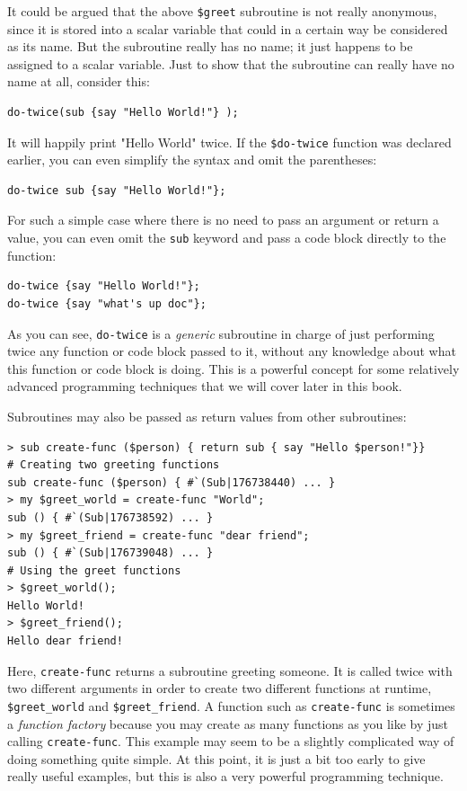 It could be argued that the above \verb"$greet" subroutine  
is not really anonymous, since it is stored into a scalar 
variable that could in a certain way be considered as its name. 
But the subroutine really has no name; it just happens to be 
assigned to a scalar variable. Just to show that the subroutine 
can really have no name at all, consider this:

\begin{verbatim}
do-twice(sub {say "Hello World!"} );
\end{verbatim}

It will happily print "Hello World" twice. If the \verb"$do-twice"
function was declared earlier, you can even simplify the syntax 
and omit the parentheses:

\begin{verbatim}
do-twice sub {say "Hello World!"};
\end{verbatim}

For such a simple case where there is no need to pass an 
argument or return a value, you can even omit the 
\verb"sub" keyword and pass a code block directly to the function:

\begin{verbatim}
do-twice {say "Hello World!"};
do-twice {say "what's up doc"};
\end{verbatim}

As you can see, \verb"do-twice" is a \emph{generic} subroutine in 
charge of just performing twice any function or code 
block passed to it, without any knowledge about what 
this function or code block is doing. This is a powerful 
concept for some relatively advanced programming techniques 
that we will cover later in this book.

Subroutines may also be passed as return values from other 
subroutines:

\begin{verbatim}
> sub create-func ($person) { return sub { say "Hello $person!"}}
# Creating two greeting functions
sub create-func ($person) { #`(Sub|176738440) ... }
> my $greet_world = create-func "World";
sub () { #`(Sub|176738592) ... }
> my $greet_friend = create-func "dear friend";
sub () { #`(Sub|176739048) ... }
# Using the greet functions
> $greet_world();
Hello World!
> $greet_friend();
Hello dear friend!
\end{verbatim} 

Here, \verb"create-func" returns a subroutine greeting someone. 
It is called twice with two different arguments in order to 
create two different functions at runtime, \verb"$greet_world" and 
\verb"$greet_friend". A function such as \verb"create-func" 
is sometimes a \emph{function factory} because you may create as many 
functions as you like by just calling \verb"create-func". This 
example may seem to be a slightly complicated way of doing 
something quite simple. At this point, it is 
just a bit too early to give really useful examples, but 
this is also a very powerful programming technique.  

